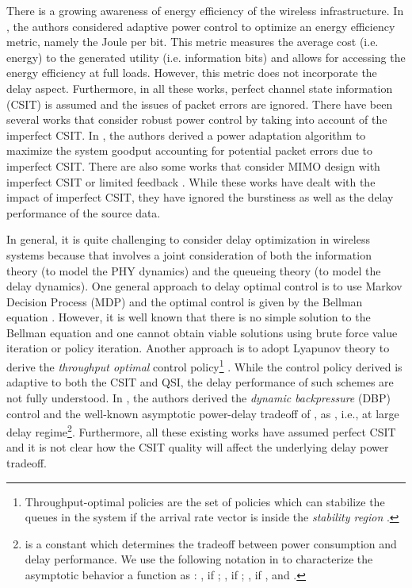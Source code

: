 \documentclass[11pt,journal, onecolumn]{./IEEEtran}
\newcommand{\blue}{\color{black}}
\newcommand{\red}{\color{black}}
\begin{document}
There is a growing awareness of energy efficiency of the wireless infrastructure. In \cite{meshkati_energy-efficient_2007, mingbo_xiao_utility-based_2003}, the authors considered adaptive power control to optimize an energy efficiency metric, namely the Joule per bit. This metric measures the average cost (i.e. energy) to the generated utility (i.e. information bits) and allows for accessing the energy efficiency at full loads. However, this metric does not incorporate the delay aspect. Furthermore, in all these works, perfect channel state information (CSIT) is assumed and the issues of packet errors are ignored.
There have been several works that consider robust power control by taking into account of the imperfect CSIT. In \cite{rey_robust_2005, yingwei_yao_rate-maximizing_2005}, the authors derived a power adaptation algorithm to maximize the system goodput accounting for potential packet errors due to imperfect CSIT.
There are also some works that consider MIMO design with imperfect CSIT \cite{rey_robust_2005, yoo_capacity_2006} or limited feedback \cite{love_overview_2008}. While these works have dealt with the impact of imperfect CSIT, they have ignored the burstiness as well as the delay performance of the source data.


In general, it is quite challenging to consider delay optimization in wireless systems because that involves a joint consideration of both the information theory (to model the PHY dynamics) and the queueing theory (to model the delay dynamics).
One general approach to delay optimal control is to use Markov Decision Process (MDP) and the optimal control is given by the Bellman equation \cite{bertsekas_dynamic_1987}. However, it is well known that there is no simple solution to the Bellman equation and one cannot obtain viable solutions using brute force value iteration or policy iteration.
Another approach is to adopt Lyapunov theory to derive the {\em throughput optimal} control policy\footnote{Throughput-optimal policies  are  the  set of policies which  can  stabilize the queues in the system if the arrival rate vector is inside the \emph{stability region} \cite{tassiulas_stability_1992}.} \cite{georgiadis_resource_2006}.
While the control policy derived is adaptive to both the CSIT and QSI, the delay performance of such schemes are not fully understood. In {\blue\cite{neely_energy_2006},} the authors derived the {\em dynamic backpressure} (DBP) control
and the well-known asymptotic power-delay tradeoff of ,  {\red as , i.e., at large delay regime\footnote{\red  is a
constant which determines the tradeoff between power consumption and delay performance. We use the following notation in \cite{berry_optimal_2006} to characterize the asymptotic behavior a function  as : , if ; , if ; , if , and .}.} Furthermore, all these existing works have assumed perfect CSIT and it is not clear how the CSIT quality will affect the underlying delay power tradeoff.
\end{document}
